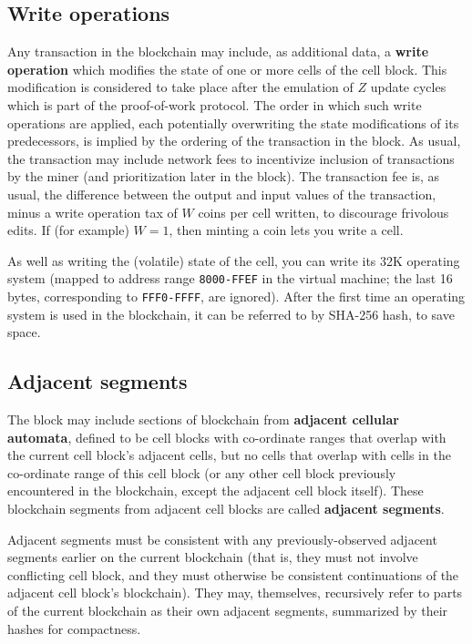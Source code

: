 \documentclass{article}
\newcommand\hex[1]{{\tt #1}}
\newcommand\hexrange[2]{\hex{#1}{\tt -}\hex{#2}}
\begin{document}
\subsection{Write operations}

Any transaction in the blockchain may include, as additional data,
a {\bf write operation} which modifies the state of one or more cells of the cell block.
This modification is considered to take place after the emulation of $Z$ update cycles
which is part of the proof-of-work protocol.
The order in which such write operations are applied,
each potentially overwriting the state modifications of its predecessors,
is implied by the ordering of the transaction in the block.
As usual, the transaction may include network fees to incentivize inclusion of transactions
by the miner
(and prioritization later in the block).
The transaction fee is, as usual, the difference between the output and input values of the transaction,
minus a write operation tax of $W$ coins per cell written,
to discourage frivolous edits.
If (for example) $W=1$, then minting a coin lets you write a cell.

As well as writing the (volatile) state of the cell, you can write its 32K operating system
(mapped to address range \hexrange{8000}{FFEF} in the virtual machine; the last 16 bytes, corresponding to \hexrange{FFF0}{FFFF}, are ignored).
After the first time an operating system is used in the blockchain, it can be referred to by SHA-256 hash, to save space.

\subsection{Adjacent segments}

The block may include sections of blockchain from {\bf adjacent cellular automata},
defined to be cell blocks with co-ordinate ranges that
overlap with the current cell block's adjacent cells,
but no cells that overlap with
cells in the co-ordinate range of this cell block (or any other cell block previously encountered in the blockchain,
except the adjacent cell block itself).
These blockchain segments from adjacent cell blocks are called {\bf adjacent segments}.

Adjacent segments must be consistent with any previously-observed adjacent segments
earlier on the current blockchain (that is, they must not involve conflicting cell block,
and they must otherwise be consistent continuations of the adjacent cell block's blockchain).
They may, themselves, recursively refer to parts of the current blockchain as their own adjacent segments,
summarized by their hashes for compactness.
\end{document}
